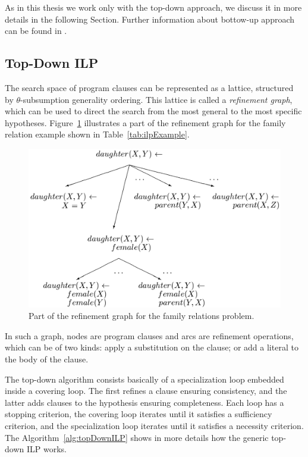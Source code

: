 As in this thesis we work only with the top-down approach, we discuss it in more details in the following Section.
Further information about bottow-up approach can be found in \citet{DBLP:journals/ml/LavracD96}.

\subsection{Top-Down ILP}

The search space of program clauses can be represented as a lattice, structured by $\theta$-subsumption generality
ordering. This lattice is called a \emph{refinement graph}, which can be used to direct the search from the most general
to the most specific hypotheses. Figure~\ref{fig:refinementGraph} illustrates a part of the refinement graph for the
family relation example shown in Table~\ref{tab:ilpExample}.

\begin{figure}[h!]
\begin{center}
  \includegraphics[width=0.7\linewidth]{./Figures/refinementGraph.png}
\end{center}
\caption{Part of the refinement graph for the family relations problem\citep{DBLP:journals/ml/LavracD96}.}
\label{fig:refinementGraph}
\end{figure}

In such a graph, nodes are program clauses and arcs are refinement operations, which can be of two kinds: apply
a substitution on the clause; or add a literal to the body of the clause.

The top-down algorithm consists basically of a specialization loop embedded inside a covering loop. The first refines a
clause ensuring consistency, and the latter adds clauses to the hypothesis ensuring completeness. Each loop has a
stopping criterion, the covering loop iterates until it satisfies a sufficiency criterion, and the specialization loop
iterates until it satisfies a necessity criterion. The Algorithm~\ref{alg:topDownILP} shows in more details how the
generic
top-down ILP works.

